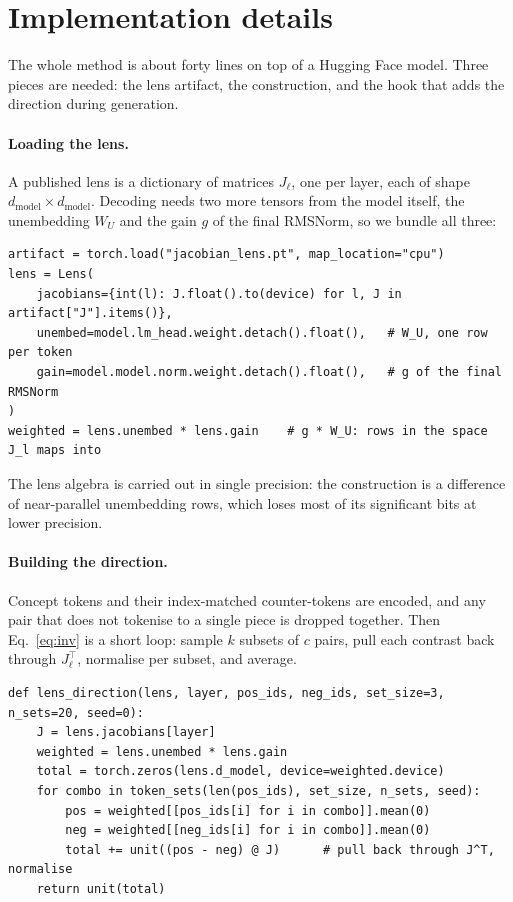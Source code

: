 \documentclass{article}
\begin{document}
\section{Implementation details}
\label{app:impl}

The whole method is about forty lines on top of a Hugging Face model. Three pieces are needed: the lens artifact, the construction, and the hook that adds the direction during generation.

\paragraph{Loading the lens.}
A published lens is a dictionary of matrices $J_\ell$, one per layer, each of shape $d_{\mathrm{model}} \times d_{\mathrm{model}}$. Decoding needs two more tensors from the model itself, the unembedding $W_U$ and the gain $g$ of the final RMSNorm, so we bundle all three:

\newpage
\begin{lstlisting}[caption={The lens and the model pieces it decodes through.},label={lst:lens}]
artifact = torch.load("jacobian_lens.pt", map_location="cpu")
lens = Lens(
    jacobians={int(l): J.float().to(device) for l, J in artifact["J"].items()},
    unembed=model.lm_head.weight.detach().float(),   # W_U, one row per token
    gain=model.model.norm.weight.detach().float(),   # g of the final RMSNorm
)
weighted = lens.unembed * lens.gain    # g * W_U: rows in the space J_l maps into
\end{lstlisting}

The lens algebra is carried out in single precision: the construction is a difference of near-parallel unembedding rows, which loses most of its significant bits at lower precision.

\paragraph{Building the direction.}
Concept tokens and their index-matched counter-tokens are encoded, and any pair that does not tokenise to a single piece is dropped together. Then Eq.~\ref{eq:inv} is a short loop: sample $k$ subsets of $c$ pairs, pull each contrast back through $J_\ell^\top$, normalise per subset, and average.

\begin{lstlisting}[caption={Lens inversion, Eq.~\ref{eq:inv}. Setting \texttt{J = I} gives the $J{=}I$ control.},label={lst:inv}]
def lens_direction(lens, layer, pos_ids, neg_ids, set_size=3, n_sets=20, seed=0):
    J = lens.jacobians[layer]
    weighted = lens.unembed * lens.gain
    total = torch.zeros(lens.d_model, device=weighted.device)
    for combo in token_sets(len(pos_ids), set_size, n_sets, seed):
        pos = weighted[[pos_ids[i] for i in combo]].mean(0)
        neg = weighted[[neg_ids[i] for i in combo]].mean(0)
        total += unit((pos - neg) @ J)      # pull back through J^T, normalise
    return unit(total)
\end{lstlisting}
\end{document}
